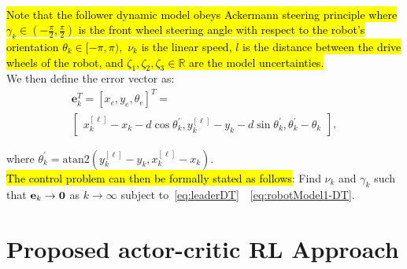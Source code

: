\documentclass[conference]{IEEEtran}
\begin{document}
 \\
\hl{Note that the follower dynamic model obeys Ackermann steering principle where $\gamma_k\in(-\frac{\pi}{2},\frac{\pi}{2})$ is the front wheel steering angle with respect to the robot's orientation $\theta_k\in[-\pi,\pi),$ $\nu_k$ is the linear speed, $l$ is the distance between the drive wheels of the robot, and $\zeta_1,\zeta_2,\zeta_3\in\mathbb{R}$ are the model uncertainties.} 
\\
We then define the error vector as:
 \begin{multline}
     \label{eq:stateError}
   \mathbf{e}_k^T = [x_e,y_e,\theta_e]^T = \\
   \begin{bmatrix}
     x_k^{[\ell]} - x_k - d\cos\theta_k^{'},
     y_k^{[\ell]} - y_k - d\sin\theta_k^{'},
     \theta_k^{'} - \theta_k
   \end{bmatrix},
 \end{multline}
 
 where $\theta_k^{'} = \mathrm{atan2}\left(y_k^{[\ell]}-y_k, x_k^{[\ell]}-x_k\right).$  
\\
\hl{The control problem can then be formally stated as follows}: Find $\nu_k$ and $\gamma_k$ such that ${\bf e}_k\to {\bf 0}$ as  $k\to\infty$ subject to~\eqref{eq:leaderDT}~~\eqref{eq:robotModel1-DT}.

%
%




\section{Proposed actor-critic RL Approach}

 \label{sec:RLSolution}
\end{document}
